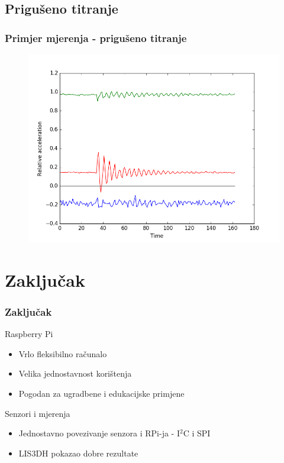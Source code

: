 \documentclass[12pt]{beamer}
\begin{document}
\subsection{Prigušeno titranje}
\begin{frame}
	\frametitle{Primjer mjerenja - prigušeno titranje}
	\begin{figure}[h]
		\centering
		\includegraphics[width=0.8\linewidth]{slike/bass3.png}
	\end{figure}
\end{frame}


\section{Zaključak}
\begin{frame}
	\frametitle{Zaključak}
	Raspberry Pi
	\begin{itemize}
		\item Vrlo fleksibilno računalo
		\item Velika jednostavnost korištenja
		\item Pogodan za ugradbene i edukacijske primjene
	\end{itemize}

	Senzori i mjerenja
	\begin{itemize}
		\item Jednostavno povezivanje senzora i RPi-ja - I$^2$C i SPI
		\item LIS3DH pokazao dobre rezultate
	\end{itemize}
\end{frame}
\end{document}
